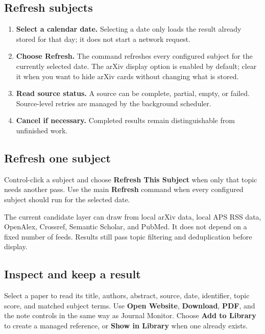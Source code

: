 \documentclass[10pt,letterpaper,oneside]{scrreprt}
\providecommand{\tightlist}{\setlength{\itemsep}{1pt}\setlength{\parskip}{0pt}}
\begin{document}
\subsection{Refresh subjects}\label{refresh-subjects}

\begin{enumerate}
\tightlist
\item
  \textbf{Select a calendar date.} Selecting a date only loads the result already stored for that day; it does not start a network request.
\item
  \textbf{Choose \textbf{Refresh}.} The command refreshes every configured subject for the currently selected date. The arXiv display option is enabled by default; clear it when you want to hide arXiv cards without changing what is stored.
\item
  \textbf{Read source status.} A source can be complete, partial, empty, or failed. Source-level retries are managed by the background scheduler.
\item
  \textbf{Cancel if necessary.} Completed results remain distinguishable from unfinished work.
\end{enumerate}

\subsection{Refresh one subject}\label{refresh-one-subject}

Control-click a subject and choose \textbf{Refresh This Subject} when only that topic needs another pass. Use the main \textbf{Refresh} command when every configured subject should run for the selected date.

The current candidate layer can draw from local arXiv data, local APS RSS data, OpenAlex, Crossref, Semantic Scholar, and PubMed. It does not depend on a fixed number of feeds. Results still pass topic filtering and deduplication before display.

\subsection{Inspect and keep a result}\label{inspect-and-keep-a-result}

Select a paper to read its title, authors, abstract, source, date, identifier, topic score, and matched subject terms. Use \textbf{Open Website}, \textbf{Download}, \textbf{PDF}, and the note controls in the same way as Journal Monitor. Choose \textbf{Add to Library} to create a managed reference, or \textbf{Show in Library} when one already exists.
\end{document}
